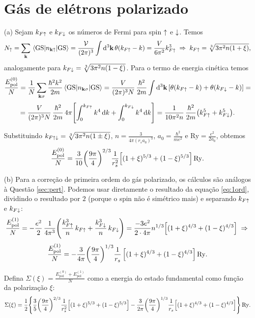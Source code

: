 \documentclass[a4paper,10pt]{article}
\begin{document}
\pagebreak

\section{Gás de elétrons polarizado}

(a) Sejam $k_{F \uparrow}$ e $k_{F \downarrow}$ os números de Fermi para spin $\uparrow$ e $\downarrow$. Temos
$$
N_{\up} = \sum_{\k} \ev{n_{\k \up}}{\text{GS}} =
\frac{\mathcal{V}}{(2\pi)^3} \int \dd[3]{\k} \theta(k_{F\up} - k) = \frac{V}{6 \pi^2} k_{F\up}^3 \implies
k_{F\up} = \sqrt[3]{3 \pi^2 n (1 + \xi)},
$$
analogamente para $k_{F\downarrow} = \sqrt[3]{3 \pi^2 n (1 - \xi)}$. Para o termo de energia cinética temos
$$
\frac{E_{\text{pol}}^{(0)}}{N} = \frac{1}{N} \sum_{\k \s} \frac{\hbar^2 k^2}{2m} \ev{n_{\k\s}}{\text{GS}} =
\frac{V}{(2 \pi)^3 N} \, \frac{\hbar^2}{2m} \int \dd[3]{\k} \qty[ \theta(k_{F\up} - k) + \theta(k_{F\down} - k) ] =
$$
$$
= \frac{V}{(2 \pi)^3 N} \, \frac{\hbar^2}{2m} \, 4 \pi \qty[\int_0^{k_{F\uparrow}} k^4 \dd{k} + \int_0^{k_{F\downarrow}} k^4 \dd{k}]
= \frac{1}{10 \pi^2 n} \, \frac{\hbar^2}{2m} \qty(k_{F\uparrow}^5 + k_{F\downarrow}^5).
$$

Substituindo $k_{F\uparrow\downarrow} = \sqrt[3]{3 \pi^2 n (1 \pm \xi)}$, $n = \frac{3}{4\pi (r_s a_0)^3}$, $a_0 = \frac{\hbar^2}{m e^2}$ e $\text{Ry} = \frac{e^2}{2a_0}$, obtemos
$$
\frac{E_{\text{pol}}^{(0)}}{N} = \frac{3}{10} \qty(\frac{9\pi}{4})^{2/3} \frac{1}{r_s^2}
\qty[(1+\xi)^{5/3} + (1-\xi)^{5/3}] \, \text{Ry}.
$$

(b) Para a correção de primeira ordem do gás polarizado, os cálculos são análogos à Questão \ref{sec:pert}. Podemos usar diretamente o resultado da equação \ref{eq:1ord}, dividindo o resultado por $2$ (porque o spin não é simétrico mais) e separando $k_{F\uparrow}$ e $k_{F\downarrow}$:
$$
\frac{E_{\text{pol}}^{(1)}}{N} =
- \frac{e^2}{2} \, \frac{1}{4\pi^3} \qty(\frac{k_{F\uparrow}^3}{n} \, k_{F\uparrow} + \frac{k_{F\downarrow}^3}{n} \, k_{F\downarrow}) =
\frac{-3e^2}{2 \cdot 4\pi} n^{1/3} \qty[(1+\xi)^{4/3} + (1-\xi)^{4/3}] \; \Rightarrow \;
$$
$$
\frac{E_{\text{pol}}^{(1)}}{N} =
- \frac{3}{4\pi} \qty(\frac{9\pi}{4})^{1/3} \frac{1}{r_s} \, \qty[(1+\xi)^{4/3} + (1-\xi)^{4/3}] \, \text{Ry}.
$$

Defina $\Sigma(\xi) = \frac{E_{\text{pol}}^{(0)} + E_{\text{pol}}^{(1)}}{N}$ como a energia do estado fundamental como função da polarização $\xi$:
$$
\Sigma(\xi) =
\frac{1}{2} \qty{ \frac{3}{5} \qty(\frac{9\pi}{4})^{2/3} \frac{1}{r_s^2}
\qty[(1+\xi)^{5/3} + (1-\xi)^{5/3}]
- \frac{3}{2\pi} \qty(\frac{9\pi}{4})^{1/3} \frac{1}{r_s} \qty[(1+\xi)^{4/3} + (1-\xi)^{4/3}]
} \, \text{Ry}.
$$
\end{document}
